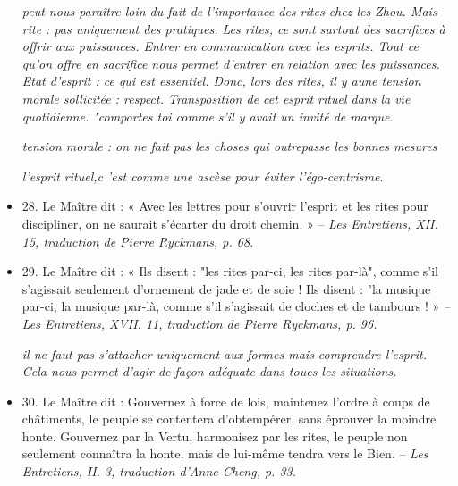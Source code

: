 \begin{itemize}
\textit{peut nous paraître loin du fait de l'importance des rites chez les Zhou. Mais rite : pas uniquement des pratiques. Les rites, ce sont surtout des sacrifices à offrir aux puissances. Entrer en communication avec les esprits. Tout ce qu'on offre en sacrifice nous permet d'entrer en relation avec les puissances. Etat d'esprit : ce qui est essentiel. Donc, lors des rites, il y aune tension morale sollicitée : respect. Transposition de cet esprit rituel dans la vie quotidienne. "comportes toi comme s'il y avait un invité de marque. }

\textit{tension morale : on ne fait pas les choses qui outrepasse les bonnes mesures}

\textit{l'esprit rituel,c 'est comme une ascèse pour éviter l'égo-centrisme}.

\item 28. \newline Le Maître dit : « Avec les lettres pour s’ouvrir l’esprit et
les rites pour discipliner, on ne saurait s’écarter du droit chemin. » -- \textit{\small  Les Entretiens, XII. 15, traduction de Pierre Ryckmans, p. 68.  }
\item 29. \newline Le Maître dit : « Ils disent : "les rites par-ci, les rites par-là", comme s’il s’agissait seulement d’ornement de jade et de soie ! Ils disent : "la musique par-ci, la musique par-là, comme s’il s’agissait de cloches et de tambours ! » \textit{\small -- Les Entretiens, XVII. 11, traduction de Pierre Ryckmans, p. 96.  }

\textit{il ne faut pas s'attacher uniquement aux formes mais comprendre l'esprit. Cela  nous permet d'agir de façon adéquate dans toues les situations. }
\item 30. \newline Le Maître dit : Gouvernez à force de lois, maintenez l’ordre à coups de châtiments, le peuple se contentera d’obtempérer, sans éprouver la moindre honte. Gouvernez par la Vertu, harmonisez par les rites, le peuple non seulement connaîtra la honte, mais de lui-même tendra vers le Bien.  -- \textit{\small  Les Entretiens, II. 3, traduction d’Anne Cheng, p. 33.  }



\end{itemize}
